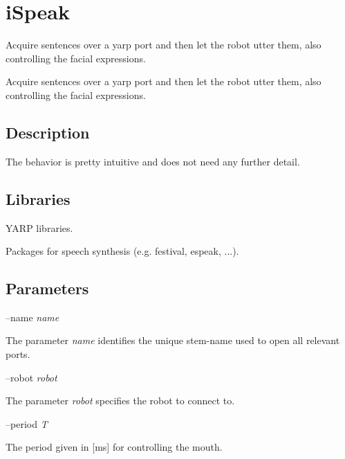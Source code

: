 \section{i\+Speak}
\label{group__iSpeak}


Acquire sentences over a yarp port and then let the robot utter them, also controlling the facial expressions.  


Acquire sentences over a yarp port and then let the robot utter them, also controlling the facial expressions. 

\hypertarget{group__windows-tts_intro_sec}{}\subsection{Description}\label{group__windows-tts_intro_sec}
The behavior is pretty intuitive and does not need any further detail.~\newline
\hypertarget{group__windows-tts_lib_sec}{}\subsection{Libraries}\label{group__windows-tts_lib_sec}

\begin{DoxyItemize}
\item Y\+A\+R\+P libraries.
\item Packages for speech synthesis (e.\+g. festival, espeak, ...).
\end{DoxyItemize}\hypertarget{group__windows-tts_parameters_sec}{}\subsection{Parameters}\label{group__windows-tts_parameters_sec}
--name {\itshape name} 
\begin{DoxyItemize}
\item The parameter {\itshape name} identifies the unique stem-\/name used to open all relevant ports.
\end{DoxyItemize}

--robot {\itshape robot} 
\begin{DoxyItemize}
\item The parameter {\itshape robot} specifies the robot to connect to.
\end{DoxyItemize}

--period {\itshape T} 
\begin{DoxyItemize}
\item The period given in \mbox{[}ms\mbox{]} for controlling the mouth.
\end{DoxyItemize}

